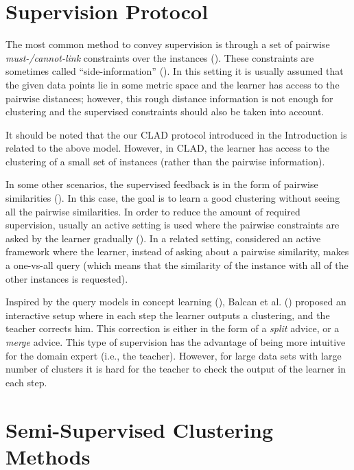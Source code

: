 \documentclass[letterpaper,12pt,titlepage,oneside,final]{book}
\begin{document}
\section{Supervision Protocol}
\label{SUP}

The most common method to convey supervision is through a set of pairwise \emph{must-/cannot-link} constraints over the instances (\cite{wagstaff2001constrained}). These constraints are sometimes called ``side-information'' (\cite{xing2002distance}). In this setting it is usually assumed that the given data points lie in some metric space and the learner has access to the pairwise distances; however, this rough distance information is not enough for clustering and the supervised constraints should also be taken into account.

It should be noted that the our CLAD protocol introduced in the Introduction is related to the above model. However, in CLAD, the learner has access to the clustering of a small set of instances (rather than the pairwise information).

In some other scenarios, the supervised feedback is in the form of pairwise similarities (\cite{krishnamurthy2012efficient, eriksson2011active}). In this case, the goal is to learn a good clustering without seeing all the pairwise similarities. In order to reduce the amount of required supervision, usually an active setting is used where the pairwise constraints are asked by the learner gradually (\cite{krishnamurthy2012efficient, eriksson2011active}). In a related setting, \cite{voevodski2012active} considered an active framework where the learner, instead of asking about a pairwise similarity, makes a one-vs-all query (which means that the similarity of the instance with all of the other instances is requested).

Inspired by the query models in concept learning (\cite{angluin1988queries}), Balcan et al. (\cite{balcan2008clustering}) proposed an interactive setup where in each step the learner outputs a clustering, and the teacher corrects him. This correction is either in the form of a \emph{split} advice, or a \emph{merge} advice. This type of supervision has the advantage of being more intuitive for the domain expert (i.e., the teacher). However, for large data sets with large number of clusters it is hard for the teacher to check the output of the learner in each step.


\section{Semi-Supervised Clustering Methods}
\end{document}
